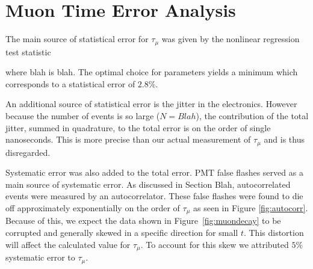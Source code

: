 
\section{Muon Time Error Analysis}\label{masstimeerroranalysis}

The main source of statistical error for $\tau_{\mu}$ was given by the nonlinear regression test statistic

where blah is blah.  The optimal choice for parameters yields a minimum which corresponds to a statistical error of $2.8\%$.  

An additional source of statistical error is the jitter in the electronics.  However because the number of events is so large ($N=Blah$), the contribution of the total jitter, summed in quadrature, to the total error is on the order of single nanoseconds.  This is more precise than our actual measurement of $\tau_{\mu}$ and is thus disregarded. 
 
Systematic error was also added to the total error.  PMT false flashes served as a main source of systematic error.  As discussed in Section Blah, autocorrelated events were measured by an autocorrelator. These false flashes were found to die off approximately exponentially on the order of $\tau_{\mu}$ as seen in Figure \ref{fig:autocorr}.  Because of this, we expect the data shown in Figure~\ref{fig:muondecay} to be corrupted and generally skewed in a specific direction for small $t$.  This distortion will affect the calculated value for $\tau_{\mu}$.  To account for this skew we attributed $5\%$ systematic error to $\tau_{\mu}$.

